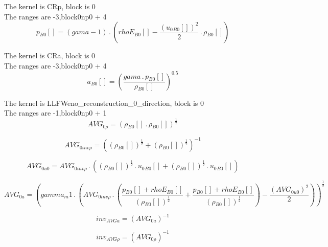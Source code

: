 \documentclass{article}
\begin{document}
\noindent The kernel is CRp, block is 0\\\noindent The ranges are -3,block0np0 + 4\\\begin{dmath}{p{_{B0}}}[{}] = \left(gama - 1\right) \,.\, \left({rhoE{_{B0}}}[{}] - \frac{\left({u_{0}{_{B0}}}[{}] \right)^{2}}{2} \,.\, {\rho{_{B0}}}[{}]\right)\end{dmath}

\noindent The kernel is CRa, block is 0\\\noindent The ranges are -3,block0np0 + 4\\\begin{dmath}{a{_{B0}}}[{}] = \left(\frac{gama \,.\, {p{_{B0}}}[{}]}{{\rho{_{B0}}}[{}]} \right)^{0.5}\end{dmath}

\noindent The kernel is LLFWeno_reconstruction_0_direction, block is 0\\\noindent The ranges are -1,block0np0 + 1\\\begin{dmath}AVG_{0 \rho} = \left({\rho{_{B0}}}[{}] \,.\, {\rho{_{B0}}}[{}] \right)^{\frac{1}{2}}\end{dmath}

\begin{dmath}AVG_{0 inv \rho} = \left(\left({\rho{_{B0}}}[{}] \right)^{\frac{1}{2}} + \left({\rho{_{B0}}}[{}] \right)^{\frac{1}{2}} \right)^{-1}\end{dmath}

\begin{dmath}AVG_{0 u0} = AVG_{0 inv \rho} \,.\, \left(\left({\rho{_{B0}}}[{}] \right)^{\frac{1}{2}} \,.\, {u_{0}{_{B0}}}[{}] + \left({\rho{_{B0}}}[{}] \right)^{\frac{1}{2}} \,.\, {u_{0}{_{B0}}}[{}]\right)\end{dmath}

\begin{dmath}AVG_{0 a} = \left(gamma_m1 \,.\, \left(AVG_{0 inv \rho} \,.\, \left(\frac{{p{_{B0}}}[{}] + {rhoE{_{B0}}}[{}]}{\left({\rho{_{B0}}}[{}] \right)^{\frac{1}{2}}} + \frac{{p{_{B0}}}[{}] + {rhoE{_{B0}}}[{}]}{\left({\rho{_{B0}}}[{}] 
\right)^{\frac{1}{2}}}\right) - \frac{\left(AVG_{0 u0} \right)^{2}}{2}\right) \right)^{\frac{1}{2}}\end{dmath}

\begin{dmath}inv_{AVG a} = \left(AVG_{0 a} \right)^{-1}\end{dmath}

\begin{dmath}inv_{AVG \rho} = \left(AVG_{0 \rho} \right)^{-1}\end{dmath}
\end{document}
